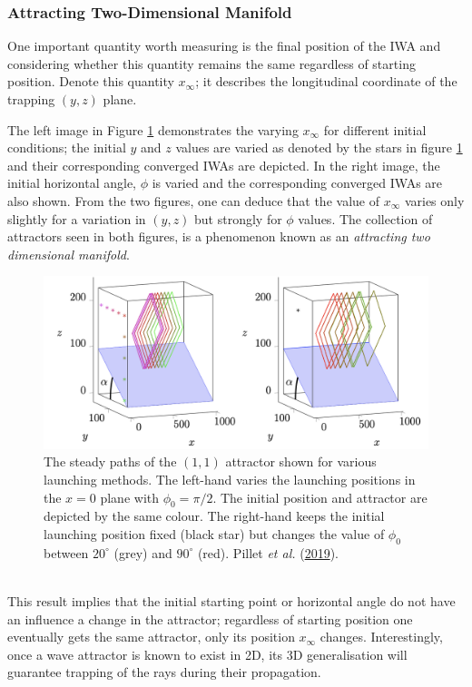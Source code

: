 \documentclass[a4paper]{article}
\numberwithin{equation}{section}
\begin{document}
\subsubsection{Attracting Two-Dimensional Manifold}
One important quantity worth measuring is the final position of the IWA and considering whether this quantity remains the same regardless of starting position. Denote this quantity $x_\infty$; it describes the longitudinal coordinate of the trapping $(y, z)$ plane. 

The left image in Figure \ref{fig:19} demonstrates the varying $x_\infty$ for different initial conditions; the initial $y$ and $z$ values are varied as denoted by the stars in figure \ref{fig:19} and their corresponding converged IWAs are depicted. In the right image, the initial horizontal angle, $\phi$ is varied and the corresponding converged IWAs are also shown. From the two figures, one can deduce that the value of $x_\infty$ varies only slightly for a variation in $(y,z)$ but strongly for $\phi$ values. The collection of attractors seen in both figures, is a phenomenon known as an \emph{attracting two dimensional manifold}. 
\begin{figure}[h!]
  \includegraphics[scale=0.5, center]{Images/manifold}
  \caption{The steady paths of the $(1,1)$ attractor shown for various launching methods. The left-hand varies the launching positions in the $x = 0$ plane with $\phi_0 = \pi/2$. The initial position and attractor are depicted by the same colour. The right-hand keeps the initial launching position fixed (black star) but changes the value of $\phi_0$ between $20^{\circ}$ (grey) and $90^{\circ}$ (red). Pillet \emph{et al.} (\protect\hyperlink{ref 37}{2019}).}
  \label{fig:19}
\end{figure} \\
This result implies that the initial starting point or horizontal angle do not have an influence a change in the attractor; regardless of starting position one eventually gets the same attractor, only its position $x_\infty$ changes. Interestingly, once a wave attractor is known to exist in 2D, its 3D generalisation will guarantee trapping of the rays during their propagation.
\end{document}
